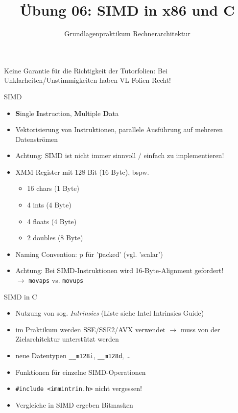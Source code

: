 

\title{Übung 06: SIMD in x86 und C}
\subtitle{Grundlagenpraktikum Rechnerarchitektur}
\date{}



\maketitle

\begin{frame}[c]{}{}
	\begin{center}
		\LARGE  Keine Garantie für die Richtigkeit der Tutorfolien: Bei Unklarheiten/Unstimmigkeiten
		haben VL-Folien Recht!
	\end{center}
\end{frame}

\begin{frame}[c, fragile]{SIMD}{}
	\begin{itemize}
		\item \textbf{S}ingle \textbf{I}nstruction, \textbf{M}ultiple \textbf{D}ata
		\item Vektorisierung von Instruktionen, parallele Ausführung auf mehreren Datenströmen
		\item Achtung: SIMD ist nicht immer sinnvoll / einfach zu implementieren!
		\item XMM-Register mit 128 Bit (16 Byte), bspw.
		      \begin{itemize}
			      \item 16 chars (1 Byte)
			      \item 4 ints (4 Byte)
			      \item 4 floats (4 Byte)
			      \item 2 doubles (8 Byte)
		      \end{itemize}
		\item Naming Convention: p für '\textbf{p}acked' (vgl. 'scalar')
		\item Achtung: Bei SIMD-Instruktionen wird 16-Byte-Alignment gefordert! \\ $\rightarrow$ \verb|movaps| vs. \verb|movups|
	\end{itemize}
\end{frame}

\begin{frame}[c, fragile]{SIMD in C}{}
	\begin{itemize}
		\item Nutzung von sog. \textit{Intrinsics} (Liste siehe Intel Intrinsics Guide)
		\item im Praktikum werden SSE/SSE2/AVX verwendet $\rightarrow$ muss von der Zielarchitektur unterstützt werden
		\item neue Datentypen \verb|__m128i|, \verb|__m128d|, \ldots
		\item Funktionen für einzelne SIMD-Operationen
		\item \verb|#include <immintrin.h>| nicht vergessen!
		\item Vergleiche in SIMD ergeben Bitmasken
	\end{itemize}
\end{frame}

